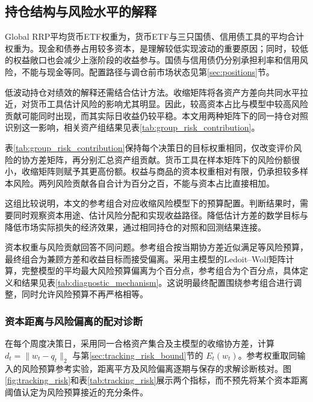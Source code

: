 \subsection{持仓结构与风险水平的解释}
Global RRP平均货币ETF权重为\primaryCashMean，货币ETF与三只国债、信用债工具的平均合计权重为\primaryDefensiveMean。现金和债券占用较多资本，是理解较低实现波动的重要原因；同时，较低的权益敞口也会减少上涨阶段的收益参与。国债与信用债仍分别承担利率和信用风险，不能与现金等同。配置路径与调仓前市场状态见第\ref{sec:positions}节。

低波动持仓对绩效的解释还需结合估计方法。收缩矩阵将各资产方差向共同水平拉近，对货币工具估计风险的影响尤其明显。因此，较高资本占比与模型中较高风险贡献可能同时出现，而其实际日收益仍较平稳。本文用两种矩阵下的同一持仓对照识别这一影响，相关资产组结果见表\ref{tab:group_risk_contribution}。

\begin{table}[htbp]\centering
\caption{同一目标持仓在两种协方差尺度下的风险贡献份额}\label{tab:group_risk_contribution}
\fitthesistable{}
\end{table}
\FloatBarrier

表\ref{tab:group_risk_contribution}保持每个决策日的目标权重相同，仅改变评价风险的协方差矩阵，再分别汇总资产组贡献。货币工具在样本矩阵下的风险份额很小，收缩矩阵则赋予其更高份额。权益与商品的资本权重相对有限，仍承担较多样本风险。两列风险贡献各自合计为百分之百，不能与资本占比直接相加。

这组比较说明，本文的参考组合对应收缩风险模型下的预算配置。判断结果时，需要同时观察资本用途、估计风险分配和实现收益路径。降低估计方差的数学目标与降低市场实际损失的经济效果，通过相同持仓的对照和回测结果连接。

资本权重与风险贡献回答不同问题。参考组合按当期协方差近似满足等风险预算，最终组合为兼顾方差和收益目标而接受偏离。采用主模型的Ledoit--Wolf矩阵计算，完整模型的平均最大风险预算偏离为\diagPrimaryRCError{}个百分点，参考组合为\diagReferenceRCError{}个百分点，具体定义和结果见表\ref{tab:diagnostic_mechanism}。这说明最终配置围绕参考组合进行调整，同时允许风险预算不再严格相等。

\subsubsection{资本距离与风险偏离的配对诊断}
\label{sec:tracking_risk_empirical}
在每个周度决策日，采用同一合格资产集合及主模型的收缩协方差，计算 $d_t=\|w_t-q_t\|_2$ 与第\ref{sec:tracking_risk_bound}节的 $E_t(w_t)$。参考权重取同输入的风险预算参考实验，距离平方及风险偏离逐期与保存的求解诊断核对。图\ref{fig:tracking_risk}和表\ref{tab:tracking_risk}展示两个指标，而不预先将某个资本距离阈值认定为风险预算接近的充分条件。
\begin{table}[htbp]\centering
\caption{资本距离与风险预算偏离的周度配对统计}\label{tab:tracking_risk}
\fitthesistable{}
\end{table}
\FloatBarrier

